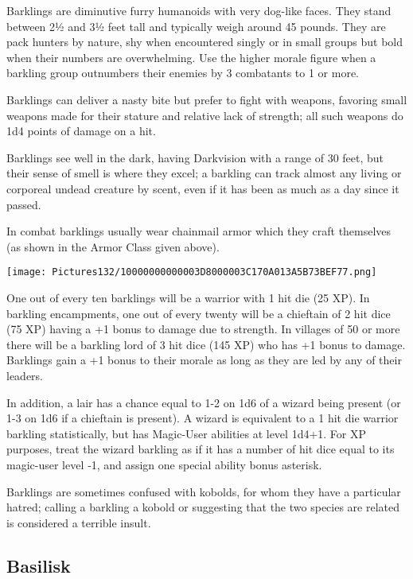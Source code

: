 \documentclass[a4paper,twoside,openany,10pt]{book}
\begin{document}
\begin{multicols}{2}
Barklings are diminutive furry humanoids with very dog-like faces. They stand between 2½ and 3½ feet tall and typically weigh around 45 pounds. They are pack hunters by nature, shy when encountered singly or in small groups but bold when their numbers are overwhelming. Use the higher morale figure when a barkling group outnumbers their enemies by 3 combatants to 1 or more.

Barklings can deliver a nasty bite but prefer to fight with weapons, favoring small weapons made for their stature and relative lack of strength; all such weapons do 1d4 points of damage on a hit. 

Barklings see well in the dark, having Darkvision with a range of 30 feet, but their sense of smell is where they excel; a barkling can track almost any living or corporeal undead creature by scent, even if it has been as much as a day since it passed.

In combat barklings usually wear chainmail armor which they craft themselves (as shown in the Armor Class given above).


\begin{center}
	\texttt{[image: Pictures132/10000000000003D8000003C170A013A5B73BEF77.png]}
\end{center}


One out of every ten barklings will be a warrior with 1 hit die (25 XP). In barkling encampments, one out of every twenty will be a chieftain of 2 hit dice (75 XP) having a +1 bonus to damage due to strength. In villages of 50 or more there will be a barkling lord of 3 hit dice (145 XP) who has +1 bonus to damage. Barklings gain a +1 bonus to their morale as long as they are led by any of their leaders.

In addition, a lair has a chance equal to 1-2 on 1d6 of a wizard being present (or 1-3 on 1d6 if a chieftain is present). A wizard is equivalent to a 1 hit die warrior barkling statistically, but has Magic-User abilities at level 1d4+1. For XP purposes, treat the wizard barkling as if it has a number of hit dice equal to its magic-user level ‑1, and assign one special ability bonus asterisk.

Barklings are sometimes confused with kobolds, for whom they have a particular hatred; calling a barkling a kobold or suggesting that the two species are related is considered a terrible insult.\\

\subsection*{Basilisk}\label{basilisk}


\end{multicols}
\end{document}
